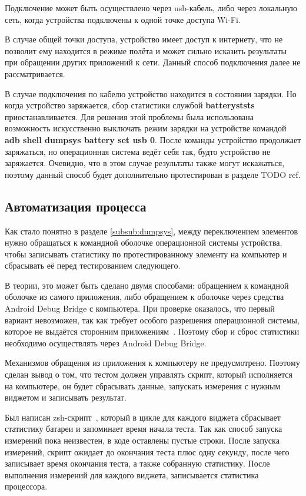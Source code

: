 \documentclass[a4paper,14pt]{extarticle} %
\begin{document}
	Подключение может быть осуществлено через usb-кабель, либо через локальную сеть, когда устройства подключены к одной точке доступа Wi-Fi.
	
	В случае общей точки доступа, устройство имеет доступ к интернету, что не позволит ему находится в режиме полёта и может сильно исказить результаты при обращении других приложений к сети. Данный способ подключения далее не рассматривается.
	
	В случае подключения по кабелю устройство находится в состоянии зарядки. Но когда устройство заряжается, сбор статистики службой \textbf{batteryststs} приостанавливается. Для решения этой проблемы была использована возможность искусственно выключать режим зарядки на устройстве командой \textbf{adb shell dumpsys battery set usb 0}. После команды устройство продолжает заряжаться, но операционная система ведёт себя так, будто устройство не заряжается. Очевидно, что в этом случае результаты также могут искажаться, поэтому данный способ будет дополнительно протестирован в разделе {\huge TODO ref}.
	
	\subsection{Автоматизация процесса}
	
	Как стало понятно в разделе \ref{subsub:dumpsys}, между переключением элементов нужно обращаться к командной оболочке операционной системы устройства, чтобы записывать статистику по протестированному элементу на компьютер и сбрасывать её перед тестированием следующего.
	
	В теории, это может быть сделано двумя способами: обращением к командной оболочке из самого приложения, либо обращением к оболочке через средства Android Debug Bridge с компьютера. При проверке оказалось, что первый вариант невозможен, так как требует особого разрешения операционной системы, которое не выдаётся сторонним приложениям~\parencite{Dump_Permission}. Поэтому сбор и сброс статистики необходимо осуществлять через Android Debug Bridge. 
	
	Механизмов обращения из приложения к компьютеру не предусмотрено. Поэтому сделан вывод о том, что тестом должен управлять скрипт, который исполняется на компьютере, он будет сбрасывать данные, запускать измерения с нужным виджетом и записывать результат.
	
	Был написан zsh-скрипт~\ris{\ref{fig:estimation}}, который в цикле для каждого виджета сбрасывает статистику батареи и запоминает время начала теста. Так как способ запуска измерений пока неизвестен, в коде оставлены пустые строки. После запуска измерений, скрипт ожидает до окончания теста плюс одну секунду, после чего записывает время окончания теста, а также собранную статистику. После выполнения измерений для каждого виджета, записывается статистика процессора.
	
\end{document}
